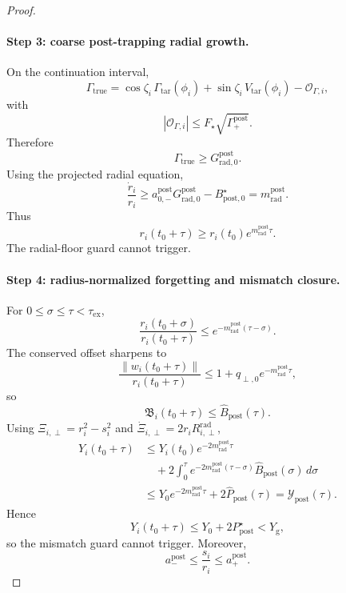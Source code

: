 \documentclass{article} %
\theoremstyle{plain}
\theoremstyle{definition}
\theoremstyle{remark}
\begin{document}
\begin{proof}
\paragraph{Step 3: coarse post-trapping radial growth.}
On the continuation interval,
\[
\Gamma_{\mathrm{true}}
=
\cos\zeta_i\,\Gamma_{\mathrm{tar}}(\phi_i)
+
\sin\zeta_i\,V_{\mathrm{tar}}(\phi_i)
-
\mathcal O_{\Gamma,i},
\]
with
\[
|\mathcal O_{\Gamma,i}|
\le
F_\star\sqrt{\Gamma_+^{\mathrm{post}}}.
\]
Therefore
\[
\Gamma_{\mathrm{true}}
\ge
G_{\mathrm{rad},0}^{\mathrm{post}}.
\]
Using the projected radial equation,
\[
\frac{\dot r_i}{r_i}
\ge
a_{0,-}^{\mathrm{post}}G_{\mathrm{rad},0}^{\mathrm{post}}
-
B_{\mathrm{post},0}^\star
=
m_{\mathrm{rad}}^{\mathrm{post}}.
\]
Thus
\[
\boxed{
r_i(t_0+\tau)
\ge
r_i(t_0)e^{m_{\mathrm{rad}}^{\mathrm{post}}\tau}.
}
\]
The radial-floor guard cannot trigger.

\paragraph{Step 4: radius-normalized forgetting and mismatch closure.}
For $0\le\sigma\le\tau<\tau_{\mathrm{ex}}$,
\[
\frac{r_i(t_0+\sigma)}{r_i(t_0+\tau)}
\le
e^{-m_{\mathrm{rad}}^{\mathrm{post}}(\tau-\sigma)}.
\]
The conserved offset sharpens to
\[
\frac{\|w_i(t_0+\tau)\|}{r_i(t_0+\tau)}
\le
1+q_{\perp,0}e^{-m_{\mathrm{rad}}^{\mathrm{post}}\tau},
\]
so
\[
\mathfrak B_i(t_0+\tau)
\le
\widehat B_{\mathrm{post}}(\tau).
\]
Using $\Xi_{i,\perp}=r_i^2-s_i^2$ and
$\dot\Xi_{i,\perp}=2r_iR_{i,\perp}^{\mathrm{rad}}$,
\[
\begin{aligned}
Y_i(t_0+\tau)
&\le
Y_i(t_0)e^{-2m_{\mathrm{rad}}^{\mathrm{post}}\tau}
\\
&\quad+
2\int_0^\tau
e^{-2m_{\mathrm{rad}}^{\mathrm{post}}(\tau-\sigma)}
\widehat B_{\mathrm{post}}(\sigma)\,d\sigma
\\
&\le
Y_0e^{-2m_{\mathrm{rad}}^{\mathrm{post}}\tau}
+2\widehat P_{\mathrm{post}}(\tau)
=
\mathcal Y_{\mathrm{post}}(\tau).
\end{aligned}
\]
Hence
\[
Y_i(t_0+\tau)
\le
Y_0+2P_{\mathrm{post}}^\star
<
Y_{\mathrm g},
\]
so the mismatch guard cannot trigger.  Moreover,
\[
a_-^{\mathrm{post}}
\le
\frac{s_i}{r_i}
\le
a_+^{\mathrm{post}}.
\]


\end{proof}
\end{document}
